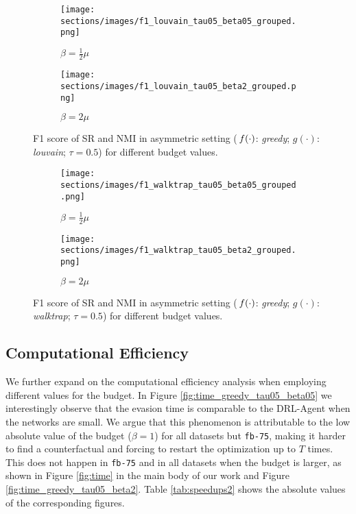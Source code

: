\begin{figure}[htpb]
    \centering
    \begin{subfigure}[b]{0.49\linewidth}
        \texttt{[image: sections/images/f1\_louvain\_tau05\_beta05\_grouped.png]}
        \caption{$\beta = \frac{1}{2}\mu$}
        \label{fig:f1_louvain_tau05_beta05}
    \end{subfigure}
    \hfill
    \begin{subfigure}[b]{0.49\linewidth}
        \texttt{[image: sections/images/f1\_louvain\_tau05\_beta2\_grouped.png]} 
        \caption{$\beta=2\mu$}
        \label{fig:f1_louvain_tau05_beta2}
    \end{subfigure}
    \caption{F1 score of SR and NMI in asymmetric setting ($\,f(\cdot)$: \textit{greedy}; $g(\cdot)$: \textit{louvain}; $\tau=0.5$) for different budget values.}
    \label{fig:comparison3}
\end{figure}

\begin{figure}[htpb]
    \centering
    \begin{subfigure}[b]{0.49\linewidth}
        \texttt{[image: sections/images/f1\_walktrap\_tau05\_beta05\_grouped.png]}
        \caption{$\beta = \frac{1}{2}\mu$}
        \label{fig:f1_walktrap_tau05_beta05}
    \end{subfigure}
    \hfill
    \begin{subfigure}[b]{0.49\linewidth}
        \texttt{[image: sections/images/f1\_walktrap\_tau05\_beta2\_grouped.png]} 
        \caption{$\beta=2\mu$}
        \label{fig:f1_walktrap_tau05_beta2}
    \end{subfigure}
    \caption{F1 score of SR and NMI in asymmetric setting ($\,f(\cdot)$: \textit{greedy}; $g(\cdot)$: \textit{walktrap}; $\tau=0.5$) for different budget values.}
    \label{fig:comparison4}
\end{figure}


\subsection{Computational Efficiency}
\label{app:comp-eff}
We further expand on the computational efficiency analysis when employing different values for the budget. In Figure \ref{fig:time_greedy_tau05_beta05} we interestingly observe that the evasion time is comparable to the DRL-Agent when the networks are small. We argue that this phenomenon is attributable to the low absolute value of the budget ($\beta = 1$) for all datasets but \texttt{fb-75}, making it harder to find a counterfactual and forcing \method{} to restart the optimization up to $T$ times. This does not happen in \texttt{fb-75} and in all datasets when the budget is larger, as shown in Figure \ref{fig:time} in the main body of our work and Figure \ref{fig:time_greedy_tau05_beta2}. Table \ref{tab:speedups2} shows the absolute values of the corresponding figures.

